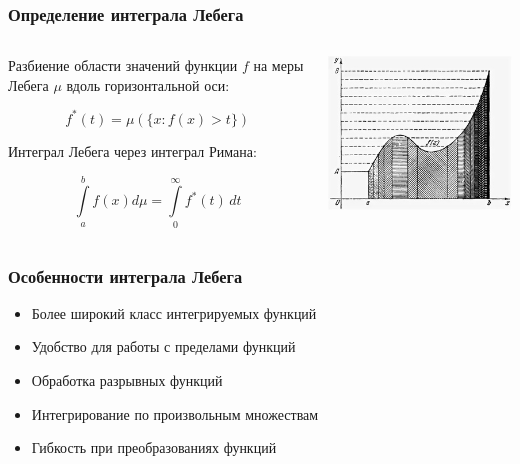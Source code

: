 \documentclass[aspectratio=169]{beamer}
\begin{document}
\begin{frame}
\frametitle{Определение интеграла Лебега}
\begin{columns}[c]
    \begin{column}{0.55\textwidth}
        Разбиение области значений функции $f$ на меры Лебега $\mu$ вдоль горизонтальной оси:

        $$
        f^*(t) = \mu(\{x : f(x) > t\})
        $$

        Интеграл Лебега через интеграл Римана:

        $$
        \int\limits_a^b f(x) d\mu = \int\limits_0^\infty f^*(t)\,dt
        $$
    \end{column}
    \begin{column}{0.35\textwidth}
        \includegraphics[width=\textwidth]{images/lebesgue_integral.jpg}
    \end{column}
\end{columns}
\end{frame}

\begin{frame}
\frametitle{Особенности интеграла Лебега}
\begin{itemize}
    \item Более широкий класс интегрируемых функций
    \item Удобство для работы с пределами функций
    \item Обработка разрывных функций
    \item Интегрирование по произвольным множествам
    \item Гибкость при преобразованиях функций
\end{itemize}
\end{frame}
\end{document}
